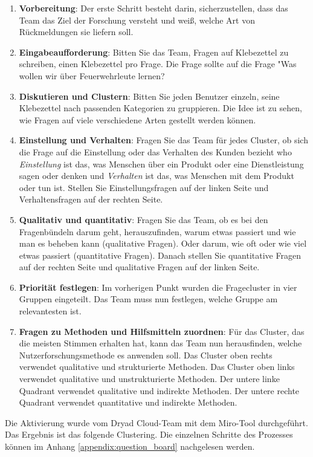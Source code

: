 \begin{enumerate}
  \item \textbf{Vorbereitung}: Der erste Schritt besteht darin, sicherzustellen, dass das Team das Ziel der Forschung versteht und weiß, welche Art von Rückmeldungen sie liefern soll.
  \item \textbf{Eingabeaufforderung}: Bitten Sie das Team, Fragen auf Klebezettel zu schreiben, einen Klebezettel pro Frage. Die Frage sollte auf die Frage "Was wollen wir über Feuerwehrleute lernen?
  \item \textbf{Diskutieren und Clustern}: Bitten Sie jeden Benutzer einzeln, seine Klebezettel nach passenden Kategorien zu gruppieren. Die Idee ist zu sehen, wie Fragen auf viele verschiedene Arten gestellt werden können.
  \item \textbf{Einstellung und Verhalten}: Fragen Sie das Team für jedes Cluster, ob sich die Frage auf die Einstellung oder das Verhalten des Kunden bezieht who \textit{Einstellung} ist das, was Menschen über ein Produkt oder eine Dienstleistung sagen oder denken und \textit{Verhalten} ist das, was Menschen mit dem Produkt oder tun ist. Stellen Sie Einstellungsfragen auf der linken Seite und Verhaltensfragen auf der rechten Seite.
  \item \textbf{Qualitativ und quantitativ}: Fragen Sie das Team, ob es bei den Fragenbündeln darum geht, herauszufinden, warum etwas passiert und wie man es beheben kann (qualitative Fragen). Oder darum, wie oft oder wie viel etwas passiert (quantitative Fragen). Danach stellen Sie quantitative Fragen auf der rechten Seite und qualitative Fragen auf der linken Seite.
  \item \textbf{Priorität festlegen}: Im vorherigen Punkt wurden die Fragecluster in vier Gruppen eingeteilt. Das Team muss nun festlegen, welche Gruppe am relevantesten ist.
  \item \textbf{Fragen zu Methoden und Hilfsmitteln zuordnen}: Für das Cluster, das die meisten Stimmen erhalten hat, kann das Team nun herausfinden, welche Nutzerforschungsmethode es anwenden soll. Das Cluster oben rechts verwendet qualitative und strukturierte Methoden. Das Cluster oben links verwendet qualitative und unstrukturierte Methoden. Der untere linke Quadrant verwendet qualitative und indirekte Methoden. Der untere rechte Quadrant verwendet quantitative und indirekte Methoden.
\end{enumerate}

Die Aktivierung wurde vom Dryad Cloud-Team mit dem Miro-Tool durchgeführt. Das Ergebnis ist das folgende Clustering. Die einzelnen Schritte des Prozesses können im Anhang \ref{appendix:question_board} nachgelesen werden.

